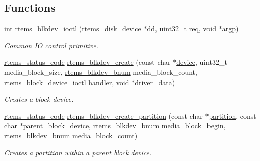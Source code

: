 \subsection*{Functions}
\begin{DoxyCompactItemize}
\item 
int \mbox{\hyperlink{group__rtems__blkdev_gab555c151c08cc5ec60ccea5d24052d23}{rtems\+\_\+blkdev\+\_\+ioctl}} (\mbox{\hyperlink{structrtems__disk__device}{rtems\+\_\+disk\+\_\+device}} $\ast$dd, uint32\+\_\+t req, void $\ast$argp)
\begin{DoxyCompactList}\small\item\em Common \mbox{\hyperlink{structIO}{IO}} control primitive. \end{DoxyCompactList}\item 
\mbox{\hyperlink{group__ClassicStatus_ga545d41846817eaba6143d52ee4d9e9fe}{rtems\+\_\+status\+\_\+code}} \mbox{\hyperlink{group__rtems__blkdev_gae2fe7e8c05fa9db0fa7c0ec4e8e4967d}{rtems\+\_\+blkdev\+\_\+create}} (const char $\ast$\mbox{\hyperlink{structdevice}{device}}, uint32\+\_\+t media\+\_\+block\+\_\+size, \mbox{\hyperlink{group__rtems__disk_ga5fbcfd40b657bff6c54d9e393fab3274}{rtems\+\_\+blkdev\+\_\+bnum}} media\+\_\+block\+\_\+count, \mbox{\hyperlink{group__rtems__disk_gacbf717f10129b976deaf8e6f4deb17ad}{rtems\+\_\+block\+\_\+device\+\_\+ioctl}} handler, void $\ast$driver\+\_\+data)
\begin{DoxyCompactList}\small\item\em Creates a block device. \end{DoxyCompactList}\item 
\mbox{\hyperlink{group__ClassicStatus_ga545d41846817eaba6143d52ee4d9e9fe}{rtems\+\_\+status\+\_\+code}} \mbox{\hyperlink{group__rtems__blkdev_ga9271a94a55c2d58494b2a43dcb55e13e}{rtems\+\_\+blkdev\+\_\+create\+\_\+partition}} (const char $\ast$\mbox{\hyperlink{structpartition}{partition}}, const char $\ast$parent\+\_\+block\+\_\+device, \mbox{\hyperlink{group__rtems__disk_ga5fbcfd40b657bff6c54d9e393fab3274}{rtems\+\_\+blkdev\+\_\+bnum}} media\+\_\+block\+\_\+begin, \mbox{\hyperlink{group__rtems__disk_ga5fbcfd40b657bff6c54d9e393fab3274}{rtems\+\_\+blkdev\+\_\+bnum}} media\+\_\+block\+\_\+count)
\begin{DoxyCompactList}\small\item\em Creates a partition within a parent block device. \end{DoxyCompactList}\item 
\mbox{\label{group__rtems__blkdev_gab318e4ab409ba1adb81fd6ad21314656}} 

\end{DoxyCompactItemize}
